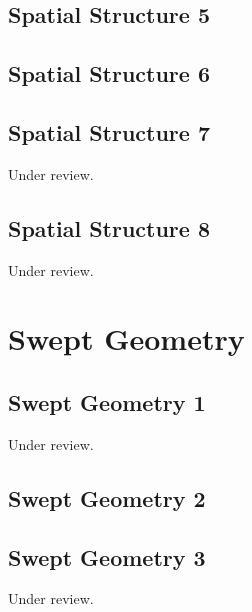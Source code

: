 \documentclass{scrartcl}
\begin{document}
\subsection{Spatial Structure 5}
\label{sec:spatial_5}
\clearpage

\subsection{Spatial Structure 6}
\label{sec:spatial_6}
\clearpage

\subsection{Spatial Structure 7} %
\label{sec:spatial_7}
Under review.%
\clearpage

\subsection{Spatial Structure 8} %
\label{sec:spatial_8}
Under review.%
\clearpage

\section{Swept Geometry}
\label{sec:swept_geometry}


\subsection{Swept Geometry 1} %
\label{sec:swept_1}
Under review.%
\clearpage

\subsection{Swept Geometry 2} %
\label{sec:swept_2}
\clearpage

\subsection{Swept Geometry 3} %
\label{sec:swept_3}
Under review.%
\clearpage
\end{document}

